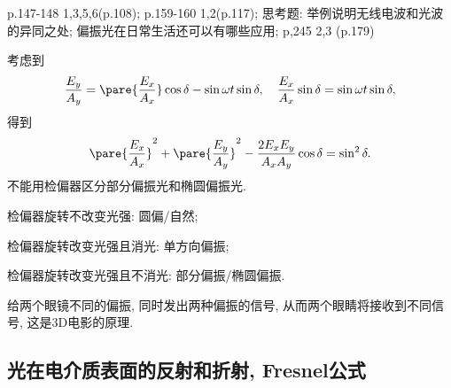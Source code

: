 \documentclass{ctexart}
\begin{document}
p.147-148 1,3,5,6(p.108); p.159-160 1,2(p.117); 思考题: 举例说明无线电波和光波的异同之处; 偏振光在日常生活还可以有哪些应用; p,245 2,3 (p.179)


考虑到
\[ \frac{E_y}{A_y} = \pare{\frac{E_x}{A_x}}\cos\delta - \sin\omega t \sin \delta,\quad \frac{E_x}{A_x} \sin\delta = \sin\omega t \sin \delta, \]
得到
\[ \pare{\frac{E_x}{A_x}}^2 + \pare{\frac{E_y}{A_y}}^2 - \frac{2E_xE_y}{A_xA_y} \cos\delta = \sin^2\delta. \]
不能用检偏器区分部分偏振光和椭圆偏振光.
\begin{cenum}
    \item 检偏器旋转不改变光强: 圆偏/自然;
    \item 检偏器旋转改变光强且消光: 单方向偏振;
    \item 检偏器旋转改变光强且不消光: 部分偏振/椭圆偏振.
\end{cenum}
\begin{remark}
    给两个眼镜不同的偏振, 同时发出两种偏振的信号, 从而两个眼睛将接收到不同信号, 这是3D电影的原理.
\end{remark}


\subsection{光在电介质表面的反射和折射, Fresnel公式} %
\label{sub:光在电介质表面的反射和折射_fresnel公式}
\end{document}

